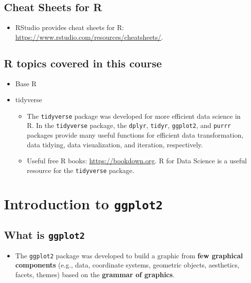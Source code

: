 \documentclass[]{book}
\providecommand{\tightlist}{%
  \setlength{\itemsep}{0pt}\setlength{\parskip}{0pt}}
\begin{document}
\section{Cheat Sheets for R}\label{cheat-sheets-for-r}

\begin{itemize}
\tightlist
\item
  RStudio provides cheat sheets for R:
  \url{https://www.rstudio.com/resources/cheatsheets/}.
\end{itemize}

\section{R topics covered in this
course}\label{r-topics-covered-in-this-course}

\begin{itemize}
\tightlist
\item
  Base R
\item
  tidyverse

  \begin{itemize}
  \tightlist
  \item
    The \texttt{tidyverse} package was developed for more efficient data
    science in R. In the \texttt{tidyverse} package, the \texttt{dplyr},
    \texttt{tidyr}, \texttt{ggplot2}, and \texttt{purrr} packages
    provide many useful functions for efficient data transformation,
    data tidying, data visualization, and iteration, respectively.
  \item
    Useful free R books: \url{https://bookdown.org}. R for Data Science
    \citep{Wickham} is a useful resource for the \texttt{tidyverse}
    package.
  \end{itemize}
\end{itemize}

\chapter{\texorpdfstring{Introduction to
\texttt{ggplot2}}{Introduction to ggplot2}}\label{introduction-to-ggplot2}

\section{\texorpdfstring{What is
\texttt{ggplot2}}{What is ggplot2}}\label{what-is-ggplot2}

\begin{itemize}
\tightlist
\item
  The \texttt{ggplot2} package \citep{ggplot2} was developed to build a
  graphic from \textbf{few graphical components} (e.g., data, coordinate
  systems, geometric objects, aesthetics, facets, themes) based on the
  \textbf{grammar of graphics}.
\end{itemize}
\end{document}

